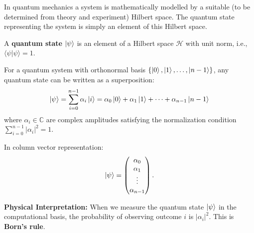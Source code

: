 In quantum mechanics a system is mathematically modelled by a suitable (to be determined from theory and experiment) Hilbert space. The quantum state representing the system is simply an element of this Hilbert space.
\begin{definition}
A \textbf{quantum state} $\ket{\psi}$ is an element of a Hilbert space $\mathcal{H}$ with unit norm, i.e., $\langle \psi|\psi \rangle = 1$.

For a quantum system with orthonormal basis $\{\ket{0}, \ket{1}, \ldots, \ket{n-1}\}$, any quantum state can be written as a superposition:
$$\ket{\psi} = \sum_{i=0}^{n-1} \alpha_i \ket{i} = \alpha_0 \ket{0} + \alpha_1 \ket{1} + \cdots + \alpha_{n-1} \ket{n-1}$$
where $\alpha_i \in \mathbb{C}$ are complex amplitudes satisfying the normalization condition $\sum_{i=0}^{n-1} |\alpha_i|^2 = 1$.

In column vector representation:
$$\ket{\psi} = \begin{pmatrix} \alpha_0 \\ \alpha_1 \\ \vdots \\ \alpha_{n-1} \end{pmatrix}.$$

\textbf{Physical Interpretation:} When we measure the quantum state $\ket{\psi}$ in the computational basis, the probability of observing outcome $i$ is $|\alpha_i|^2$. This is \textbf{Born's rule}.
\end{definition}


